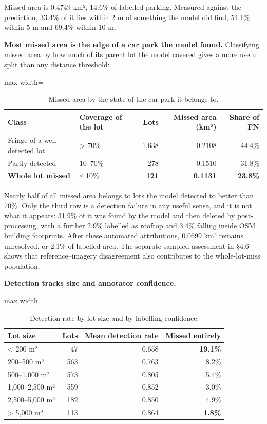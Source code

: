 Missed area is 0.4749 km², 14.6\% of labelled parking. Measured against the prediction, 33.4\% of it lies within 2 m of something the model did find, 54.1\% within 5 m and 69.4\% within 10 m.

\textbf{Most missed area is the edge of a car park the model found.} Classifying missed area by how much of its parent lot the model covered gives a more useful split than any distance threshold:

\begin{table}[htbp]
\centering
\caption{Missed area by the state of the car park it belongs to.}\label{tab:4.3}
\begin{adjustbox}{max width=\textwidth}
\begin{tabular}{@{}llrrr@{}}
\toprule
Class & Coverage of the lot & Lots & Missed area (km²) & Share of FN \\
\midrule
Fringe of a well-detected lot & \textgreater{} 70\% & 1,638 & 0.2108 & 44.4\% \\
Partly detected & 10--70\% & 278 & 0.1510 & 31.8\% \\
\textbf{Whole lot missed} & ≤ 10\% & \textbf{121} & \textbf{0.1131} & \textbf{23.8\%} \\
\bottomrule
\end{tabular}
\end{adjustbox}
\end{table}
\restoreparskip

Nearly half of all missed area belongs to lots the model detected to better than 70\%. Only the third row is a detection failure in any useful sense, and it is not what it appears: 31.9\% of it was found by the model and then deleted by post-processing, with a further 2.9\% labelled as rooftop and 3.4\% falling inside OSM building footprints. After these automated attributions, 0.0699 km² remains unresolved, or 2.1\% of labelled area. The separate sampled assessment in §4.6 shows that reference--imagery disagreement also contributes to the whole-lot-miss population.

\textbf{Detection tracks size and annotator confidence.}

\begin{table}[htbp]
\centering
\caption{Detection rate by lot size and by labelling confidence.}\label{tab:4.4}
\begin{adjustbox}{max width=\textwidth}
\begin{tabular}{@{}lrrr@{}}
\toprule
Lot size & Lots & Mean detection rate & Missed entirely \\
\midrule
\textless{} 200 m² & 47 & 0.658 & \textbf{19.1\%} \\
200--500 m² & 563 & 0.763 & 8.2\% \\
500--1,000 m² & 573 & 0.805 & 5.4\% \\
1,000--2,500 m² & 559 & 0.852 & 3.0\% \\
2,500--5,000 m² & 182 & 0.850 & 4.9\% \\
\textgreater{} 5,000 m² & 113 & 0.864 & \textbf{1.8\%} \\
\bottomrule
\end{tabular}
\end{adjustbox}
\end{table}
\restoreparskip

